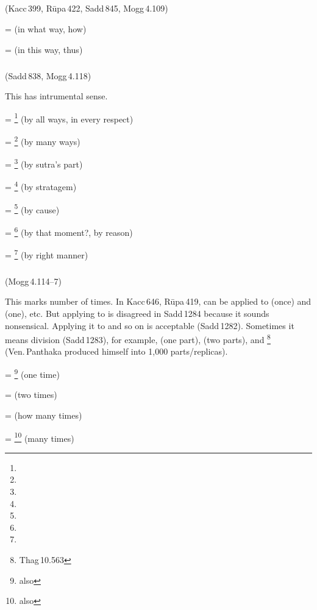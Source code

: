 \subparagraph*{} (Kacc\,399, R\=upa\,422, Sadd\,845, Mogg\,4.109)\label{pacct13:thadm}

 =  (in what way, how) \par
{} =  (in this way, thus) \par

\subparagraph*{} (Sadd\,838, Mogg\,4.118)\label{pacct13:so}

This  has intrumental sense.
	
 = \footnote{} (by all ways, in every respect) \par
{} = \footnote{} (by many ways) \par
{} = \footnote{} (by sutra's part) \par
{} = \footnote{} (by stratagem) \par
{} = \footnote{} (by cause) \par
{} = \footnote{} (by that moment?, by reason) \par
{} = \footnote{} (by right manner) \par

\subparagraph*{} (Mogg\,4.114--7)\label{pacct13:kkhattudm}

This  marks number of times. In Kacc\,646, R\=upa\,419,  can be applied to  (once) and  (one), etc. But applying to  is disagreed in Sadd\,1284 because it sounds nonsensical. Applying it to  and so on is acceptable (Sadd\,1282). Sometimes it means division (Sadd\,1283), for example,  (one part),  (two parts), and \footnote{Thag\,10.563} \\(Ven.\,Panthaka produced himself into 1,000 parts/replicas).

 = \footnote{also } (one time) \par
{} =  (two times) \par
{} =  (how many times) \par
{} = \footnote{also } (many times) \par

